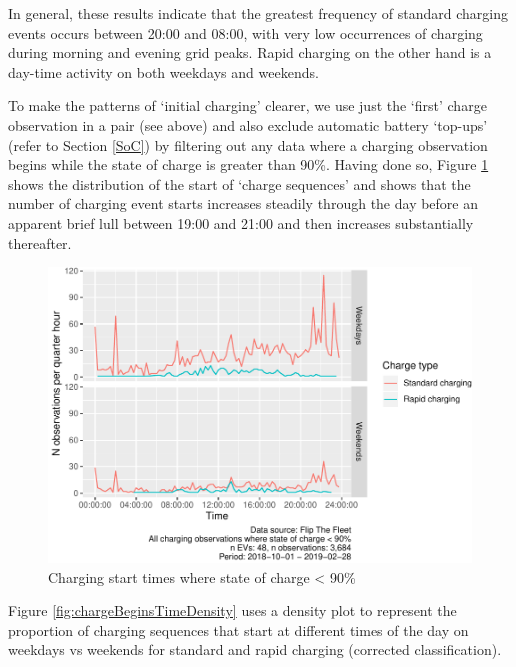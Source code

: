\documentclass[]{article}
\begin{document}
In general, these results indicate that the greatest frequency of standard charging events occurs between 20:00 and 08:00, with very low occurrences of charging during morning and evening grid peaks. Rapid charging on the other hand is a day-time activity on both weekdays and weekends.

To make the patterns of `initial charging' clearer, we use just the `first' charge observation in a pair (see above) and also exclude automatic battery `top-ups' (refer to Section \ref{SoC}) by filtering out any data where a charging observation begins while the state of charge is greater than 90\%. Having done so, Figure \ref{fig:chargeBeginsTimeLine} shows the distribution of the start of `charge sequences' and shows that the number of charging event starts increases steadily through the day before an apparent brief lull between 19:00 and 21:00 and then increases substantially thereafter.

\begin{figure}
\centering
\includegraphics{EVBB_report_v1_files/figure-latex/chargeBeginsTimeLine-1.pdf}
\caption{\label{fig:chargeBeginsTimeLine}Charging start times where state of charge \textless{} 90\%}
\end{figure}

Figure \ref{fig:chargeBeginsTimeDensity} uses a density plot to represent the proportion of charging sequences that start at different times of the day on weekdays vs weekends for standard and rapid charging (corrected classification).
\end{document}

